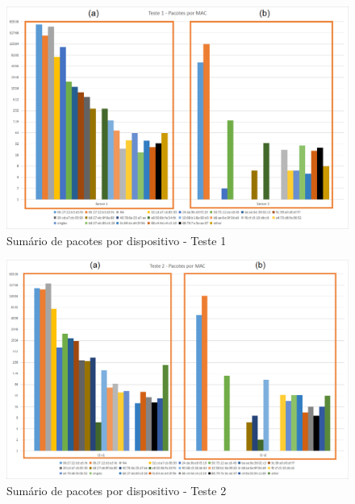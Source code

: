 \clearpage
\begin{figure}[ht]
	\centering
	\caption{\label{fig-mg4-noise-t1}Sumário de pacotes por dispositivo - Teste 1}
	\includegraphics[height=0.32\textheight,width=1\textwidth]{060-testes/data-analisis/distance-mg4plus-netflix/Teste1.png}
\end{figure}

\begin{figure}[hb]
	\centering
	\caption{\label{fig-mg4-noise-t2}Sumário de pacotes por dispositivo - Teste 2}
	\includegraphics[height=0.32\textheight,width=1\textwidth]{060-testes/data-analisis/distance-mg4plus-netflix/Teste2.png}
\end{figure}


